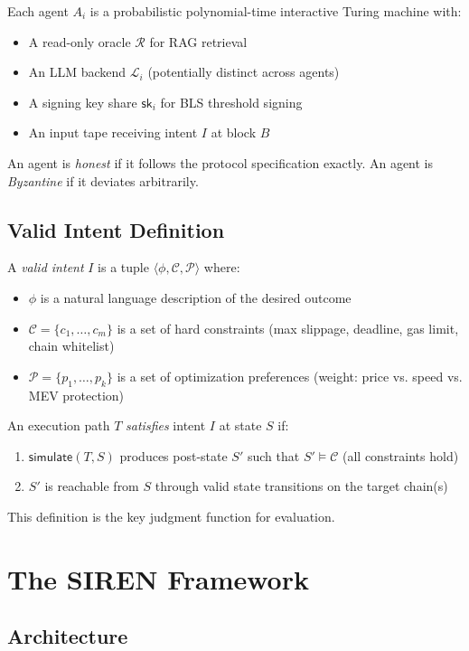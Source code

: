 \documentclass[11pt]{article}
\begin{document}
Each agent $A_i$ is a probabilistic polynomial-time interactive Turing machine with:
\begin{itemize}
  \item A read-only oracle $\mathcal{R}$ for RAG retrieval
  \item An LLM backend $\mathcal{L}_i$ (potentially distinct across agents)
  \item A signing key share $\mathsf{sk}_i$ for BLS threshold signing
  \item An input tape receiving intent $I$ at block $B$
\end{itemize}
An agent is \emph{honest} if it follows the protocol specification exactly. An agent is \emph{Byzantine} if it deviates arbitrarily.

\subsection{Valid Intent Definition}

A \emph{valid intent} $I$ is a tuple $\langle \phi, \mathcal{C}, \mathcal{P} \rangle$ where:
\begin{itemize}
  \item $\phi$ is a natural language description of the desired outcome
  \item $\mathcal{C} = \{c_1,\ldots,c_m\}$ is a set of hard constraints (max slippage, deadline, gas limit, chain whitelist)
  \item $\mathcal{P} = \{p_1,\ldots,p_k\}$ is a set of optimization preferences (weight: price vs. speed vs. MEV protection)
\end{itemize}
An execution path $T$ \emph{satisfies} intent $I$ at state $S$ if:
\begin{enumerate}
  \item $\mathsf{simulate}(T, S)$ produces post-state $S'$ such that $S' \models \mathcal{C}$ (all constraints hold)
  \item $S'$ is reachable from $S$ through valid state transitions on the target chain(s)
\end{enumerate}
This definition is the key judgment function for evaluation.

\section{The SIREN Framework}
\label{sec:framework}

\subsection{Architecture}
\end{document}
